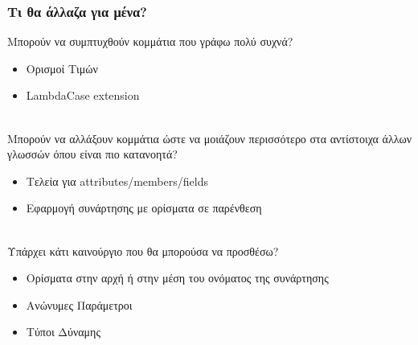 \documentclass{beamer}
\def\e{\foreignlanguage{english}}
\begin{document}
\begin{frame}

\frametitle{Τι θα άλλαζα για μένα?}

Μπορούν να συμπτυχθούν κομμάτια που γράφω πολύ συχνά?
\begin{itemize}

\item Ορισμοί Τιμών

\item \e{LambdaCase extension}
\\~\

\end{itemize}

Μπορούν να αλλάξουν κομμάτια ώστε να μοιάζουν περισσότερο στα αντίστοιχα άλλων
γλωσσών όπου είναι πιο κατανοητά?
\begin{itemize}

\item Τελεία για \e{attributes/members/fields}

\item Εφαρμογή συνάρτησης με ορίσματα σε παρένθεση
\\~\

\end{itemize}

Υπάρχει κάτι καινούργιο που θα μπορούσα να προσθέσω?
\begin{itemize}

\item Ορίσματα στην αρχή ή στην μέση του ονόματος της συνάρτησης

\item Ανώνυμες Παράμετροι

\item Τύποι Δύναμης

\end{itemize}

\end{frame}
\end{document}
